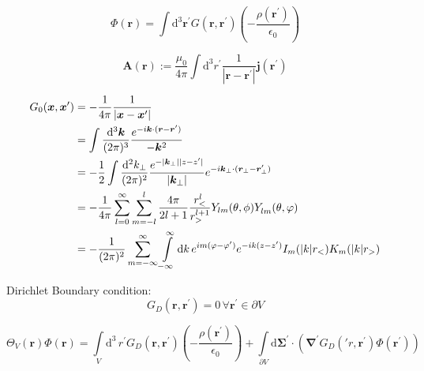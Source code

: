 \documentclass[a4paper]{article}
\renewcommand{\vec}[1]{\boldsymbol{#1}}
\begin{document}
\begin{equation}
    \Phi(\vec{r}) = \int \mathrm{d}^{3} \vec{r}^{\prime} G(\vec{r}, \vec{r}^{\prime}) \left( - \frac{\rho(\vec{r}^{\prime})}{\epsilon_{0}}\right)
\end{equation}

\begin{equation}
    \vec{A}(\vec{r}) := \frac{\mu_{0}}{4 \pi} \int \mathrm{d}^{3} r^{\prime} \frac{1}{| \vec{r} - \vec{r}^{\prime}|} \vec{j}(\vec{r}^{\prime})
\end{equation}


\begin{align}
    G_0(\vec{x}, \vec{x}^{\prime}) &= - \frac{1}{4 \pi} \frac{1}{|\vec{x} - \vec{x}^{\prime}|} \\
                                   &= \int \frac{\mathrm{d}^{3} \vec{k}}{(2 \pi)^{3}} \frac{ e^{-i \vec{k} \cdot (\vec{r} - \vec{r}^{\prime})}}{-\vec{k}^{2}} \\
                                   &= -\frac{1}{2} \int \frac{\mathrm{d}^{2} k_{\perp}}{(2 \pi)^{2}} \frac{e^{- |\vec{k}_{\perp}| |z - z^{\prime}|}}{|\vec{k}_{\perp}|} e^{-i \vec{k}_{\perp} \cdot (\vec{r}_{\perp} - \vec{r}^{\prime}_{\perp})} \\
                                   &= - \frac{1}{4 \pi} \sum\limits_{l=0}^{\infty} \sum\limits_{m=-l}^{l} \frac{4 \pi}{2l+1} \frac{r_{<}^{l}}{r_{>}^{l+1}} Y_{lm}(\theta, \phi) Y_{lm}^{\*}(\theta, \varphi) \\
                                   &= -\frac{1}{(2 \pi)^{2}} \sum\limits_{m=-\infty}^{\infty} \int\limits_{-\infty}^{\infty} \mathrm{d}k \, e^{im (\varphi - \varphi^{\prime})} e^{-ik(z-z^{\prime})} I_{m}(|k| r_{<}) K_{m}(|k| r_{>})
\end{align}

Dirichlet Boundary condition:
\begin{equation}
    G_{D}(\vec{r}, \vec{r}^{\prime}) = 0 \, \forall \vec{r}^{\prime} \in \partial V
\end{equation}

\begin{equation}
    \Theta_{V}(\vec{r}) \Phi(\vec{r}) =
    \int\limits_{V} \mathrm{d}^{3} \, r^{\prime} G_{D}(\vec{r}, \vec{r}^{\prime}) \left( - \frac{\rho(\vec{r}^{\prime})}{\epsilon_{0}}\right)
    + \int\limits_{\partial V} \mathrm{d} \vec{\Sigma}^{\prime} \cdot \left( \vec{\nabla}^{\prime} G_{D}(\prime{r}, \vec{r}^{\prime}) \Phi(\vec{r}^{\prime})  \right)
\end{equation}
\end{document}
